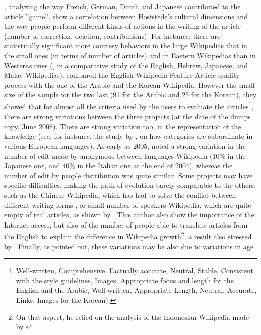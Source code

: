 \citet{PfeilZaphirisAng06}, analyzing the way French, German, Dutch
and Japanese contributed to the article ''game'', show a correlation
between Hosfstede\textquoteright s cultural dimensions \citep{Hofstede91,HofstedeMcCrae04}
and the way people perform different kinds of actions in the writing
of the article (number of correction, deletion, contributions). For
instance, there are statistically significant more courtesy behaviors
in the large Wikipedias that in the small ones (in terms of number
of articles) and in Eastern Wikipedias than in Westerns ones (\citealp{HaraShachafHew10},
in a comparative study of the English, Hebrew, Japanese, and Malay
Wikipedias). \citet{Stviliaetal09} compared the English Wikipedia
Feature Article quality process with the one of the Arabic and the
Korean Wikipedia. However the small size of the sample for the two
last (91 for the Arabic and 25 for the Korean), they showed that for
almost all the criteria used by the users to evaluate the articles\footnote{Well-written, Comprehensive, Factually accurate, Neutral, Stable,
Consistent with the style guidelines, Images, Appropriate focus and
length for the English and the Arabic, Well-written, Appropriate Length,
Neutral, Accurate, Links, Images for the Korean).}, there are strong variations between the three projects (at the date
of the dumps copy, June 2008). There are strong variation too, in
the representation of the knowledge (see, for instance, the study
by \citealp[part 6, p. 10]{Hammwohner07}, on how categories are subordinate
in various European languages). As early as 2005, \citet{Voss05}
noted a strong variation in the number of edit made by anonymous between
languages Wikipedia (10\% in the Japanese one, and 40\% in the Italian
one at the end of 2004), whereas the number of edit by people distribution
was quite similar. Some projects may have specific difficulties, making
the path of evolution barely comparable to the others, such as the
Chinese Wikipedia, which has had to solve the conflict between different
writing forms \citep{Liao08}, or small number of speakers Wikipedia,
which are quite empty of real articles, as shown by \citet{vanDijk09}.
This author also show the importance of the Internet access, but also
of the number of people able to translate articles from the English
to explain the difference in Wikipedia growth\footnote{On that aspect, he relied on the analysis of the Indonesian Wikipedia
made by \citet{SoekatnoGiri05} }, a result also stressed by \citet{Stviliaetal09}. Finally, as \citet{LiuIyer07}
pointed out, these variations may be also due to variations in age
